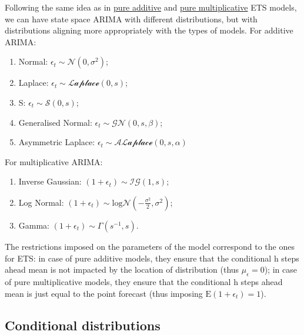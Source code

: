 \documentclass[
]{book}
\providecommand{\tightlist}{%
  \setlength{\itemsep}{0pt}\setlength{\parskip}{0pt}}
\theoremstyle{definition}
\theoremstyle{definition}
\theoremstyle{definition}
\theoremstyle{definition}
\theoremstyle{remark}
\begin{document}
Following the same idea as in \protect\hyperlink{ADAMETSAdditiveDistributions}{pure additive} and \href{ADAMETSMultiplicativeDistributions}{pure multiplicative} ETS models, we can have state space ARIMA with different distributions, but with distributions aligning more appropriately with the types of models. For additive ARIMA:

\begin{enumerate}
\def\labelenumi{\arabic{enumi}.}
\tightlist
\item
  Normal: \(\epsilon_t \sim \mathcal{N}(0, \sigma^2)\);
\item
  Laplace: \(\epsilon_t \sim \mathcal{Laplace}(0, s)\);
\item
  S: \(\epsilon_t \sim \mathcal{S}(0, s)\);
\item
  Generalised Normal: \(\epsilon_t \sim \mathcal{GN}(0, s, \beta)\);
\item
  Asymmetric Laplace: \(\epsilon_t \sim \mathcal{ALaplace}(0, s, \alpha)\)
\end{enumerate}

For multiplicative ARIMA:

\begin{enumerate}
\def\labelenumi{\arabic{enumi}.}
\tightlist
\item
  Inverse Gaussian: \(\left(1+\epsilon_t \right) \sim \mathcal{IG}(1, s)\);
\item
  Log Normal: \(\left(1+\epsilon_t \right) \sim \text{log}\mathcal{N}\left(-\frac{\sigma^2}{2}, \sigma^2\right)\);
\item
  Gamma: \(\left(1+\epsilon_t \right) \sim \mathcal{\Gamma}(s^{-1}, s)\).
\end{enumerate}

The restrictions imposed on the parameters of the model correspond to the ones for ETS: in case of pure additive models, they ensure that the conditional h steps ahead mean is not impacted by the location of distribution (thus \(\mu_\epsilon=0\)); in case of pure multiplicative models, they ensure that the conditional h steps ahead mean is just equal to the point forecast (thus imposing \(\mathrm{E}(1+\epsilon_t)=1\)).

\hypertarget{conditional-distributions}{%
\subsection{Conditional distributions}\label{conditional-distributions}}
\end{document}

